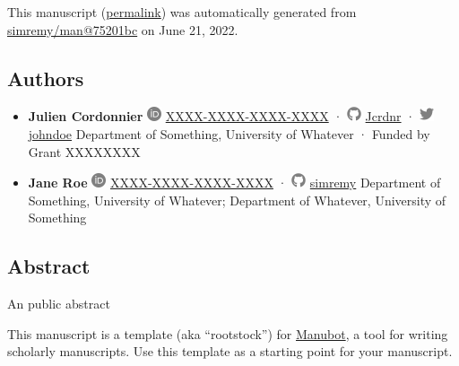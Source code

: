 This manuscript
(\href{https://simremy.github.io/man/v/75201bced68b86a8c386cdb2ca4c9eaa074a74e9/}{permalink})
was automatically generated
from \href{https://github.com/simremy/man/tree/75201bced68b86a8c386cdb2ca4c9eaa074a74e9}{simremy/man@75201bc}
on June 21, 2022.

\hypertarget{authors}{%
\subsection{Authors}\label{authors}}

\begin{itemize}
\item
  \textbf{Julien Cordonnier}
  \includegraphics[width=0.16667in,height=0.16667in]{images/orcid.svg}
  \href{https://orcid.org/XXXX-XXXX-XXXX-XXXX}{XXXX-XXXX-XXXX-XXXX}
  · \includegraphics[width=0.16667in,height=0.16667in]{images/github.svg}
  \href{https://github.com/Jcrdnr}{Jcrdnr}
  · \includegraphics[width=0.16667in,height=0.16667in]{images/twitter.svg}
  \href{https://twitter.com/johndoe}{johndoe}
  Department of Something, University of Whatever
  · Funded by Grant XXXXXXXX
\item
  \textbf{Jane Roe}
  \includegraphics[width=0.16667in,height=0.16667in]{images/orcid.svg}
  \href{https://orcid.org/XXXX-XXXX-XXXX-XXXX}{XXXX-XXXX-XXXX-XXXX}
  · \includegraphics[width=0.16667in,height=0.16667in]{images/github.svg}
  \href{https://github.com/simremy}{simremy}
  Department of Something, University of Whatever; Department of Whatever, University of Something
\end{itemize}

\hypertarget{abstract}{%
\subsection{Abstract}\label{abstract}}

An public abstract

This manuscript is a template (aka ``rootstock'') for \href{https://manubot.org/}{Manubot}, a tool for writing scholarly manuscripts.
Use this template as a starting point for your manuscript.

